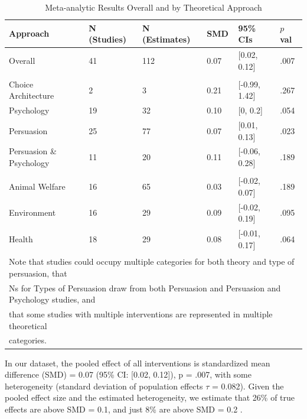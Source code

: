 \documentclass[preprint, 3p,
authoryear]{elsarticle} %
\begin{document}
\begin{table}[!ht]
\centering
\caption{\label{tab:table_one}Meta-analytic Results Overall and by Theoretical Approach}
\centering
\begin{tabular}[t]{llllll}
\toprule
Approach & N (Studies) & N (Estimates) & SMD & 95\% CIs & $p$ val\\
\midrule
Overall & 41 & 112 & 0.07 & {}[0.02, 0.12] & .007\\
\addlinespace[0.5em]
\multicolumn{6}{l}{\textbf{Theory}}\\
\hspace{1em}Choice Architecture & 2 & 3 & 0.21 & {}[-0.99, 1.42] & .267\\
\hspace{1em}Psychology & 19 & 32 & 0.10 & {}[0, 0.2] & .054\\
\hspace{1em}Persuasion & 25 & 77 & 0.07 & {}[0.01, 0.13] & .023\\
\hspace{1em}Persuasion \& Psychology & 11 & 20 & 0.11 & {}[-0.06, 0.28] & .189\\
\addlinespace[0.5em]
\multicolumn{6}{l}{\textbf{Type of Persuasion}}\\
\hspace{1em}Animal Welfare & 16 & 65 & 0.03 & {}[-0.02, 0.07] & .189\\
\hspace{1em}Environment & 16 & 29 & 0.09 & {}[-0.02, 0.19] & .095\\
\hspace{1em}Health & 18 & 29 & 0.08 & {}[-0.01, 0.17] & .064\\
\bottomrule
\multicolumn{6}{l}{\textsuperscript{} Note that studies could occupy multiple categories for both theory and type of persuasion, that}\\
\multicolumn{6}{l}{Ns for Types of Persuasion draw from both Persuasion and Persuasion and Psychology studies, and}\\
\multicolumn{6}{l}{that some studies with multiple interventions are represented in multiple theoretical}\\
\multicolumn{6}{l}{categories.}\\
\end{tabular}
\end{table}

In our dataset, the pooled effect of all interventions is standardized
mean difference (SMD) = 0.07 (95\% CI: {[}0.02, 0.12{]}), p = .007, with
some heterogeneity (standard deviation of population effects \(\tau\) =
0.082). Given the pooled effect size and the estimated heterogeneity, we
estimate that 26\% of true effects are above SMD = 0.1, and just 8\% are
above SMD = 0.2 \citep{mathur2019, mathur2020robust}.
\end{document}
